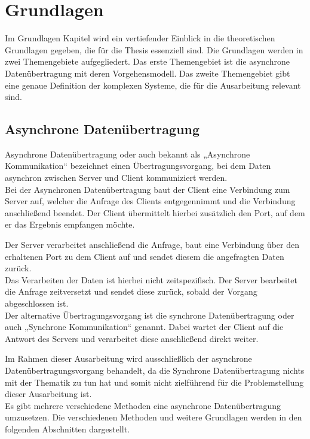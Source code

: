 \chapter{Grundlagen}
\label{ch:grundlagen}
Im Grundlagen Kapitel wird ein vertiefender Einblick in die theoretischen Grundlagen gegeben, die für die Thesis essenziell sind. 
Die Grundlagen werden in zwei Themengebiete aufgegliedert. Das erste Themengebiet ist die asynchrone Datenübertragung mit deren Vorgehensmodell. 
Das zweite Themengebiet gibt eine genaue Definition der komplexen Systeme, die für die Ausarbeitung relevant sind. 

\section{Asynchrone Datenübertragung}
Asynchrone Datenübertragung oder auch bekannt als „Asynchrone Kommunikation“ bezeichnet einen Übertragungsvorgang, bei dem Daten asynchron zwischen Server und Client kommuniziert werden. \cite{abts:2019} \\

Bei der Asynchronen Datenübertragung baut der Client eine Verbindung zum Server auf, welcher die Anfrage des Clients entgegennimmt und die Verbindung anschließend beendet. \cite{abts:2019} 
Der Client übermittelt hierbei zusätzlich den Port, auf dem er das Ergebnis empfangen möchte. 

Der Server verarbeitet anschließend die Anfrage, baut eine Verbindung über den erhaltenen Port zu dem Client auf und sendet diesem die angefragten Daten zurück. \\

Das Verarbeiten der Daten ist hierbei nicht zeitspezifisch. Der Server bearbeitet die Anfrage zeitversetzt und sendet diese zurück, sobald der Vorgang abgeschlossen ist. \cite*{tremp:2021} \\

Der alternative Übertragungsvorgang ist die synchrone Datenübertragung oder auch „Synchrone Kommunikation“ genannt. Dabei wartet der Client auf die Antwort des Servers und verarbeitet diese anschließend direkt weiter. 

Im Rahmen dieser Ausarbeitung wird ausschließlich der asynchrone Datenübertragungsvorgang behandelt, da die Synchrone Datenübertragung nichts mit der Thematik zu tun hat und somit nicht zielführend für die Problemstellung dieser Ausarbeitung ist. \\

Es gibt mehrere verschiedene Methoden eine asynchrone Datenübertragung umzusetzen. Die verschiedenen Methoden und weitere Grundlagen werden in den folgenden Abschnitten dargestellt. 

